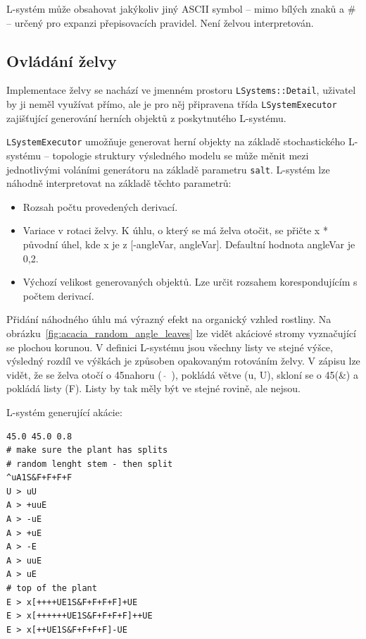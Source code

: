 \documentclass[thesis=M,czech]{FITthesis}[2019/12/23]
\begin{document}
L-systém může obsahovat jakýkoliv jiný ASCII symbol -- mimo bílých znaků a \# -- určený pro expanzi přepisovacích pravidel. Není želvou interpretován.

\subsection{Ovládání želvy}
Implementace želvy se nachází ve jmenném prostoru \texttt{LSystems::Detail}, uživatel by ji neměl využívat přímo, ale je pro něj připravena třída \texttt{LSystemExecutor} zajišťující generování herních objektů z poskytnutého L-systému.

\texttt{LSystemExecutor} umožňuje generovat herní objekty na základě stochastického L-systému -- topologie struktury výsledného modelu se může měnit mezi jednotlivými voláními generátoru na základě parametru \texttt{salt}. L-systém lze náhodně interpretovat na základě těchto parametrů:

\begin{itemize}
\item Rozsah počtu provedených derivací.
\item Variace v rotaci želvy. K úhlu, o který se má želva otočit, se přičte x * původní úhel, kde x je z [-angleVar, angleVar]. Defaultní hodnota angleVar je 0,2.
\item Výchozí velikost generovaných objektů. Lze určit rozsahem korespondujícím s počtem derivací.
\end{itemize}

Přidání náhodného úhlu má výrazný efekt na organický vzhled rostliny. Na obrázku~\ref{fig:acacia_random_angle_leaves} lze vidět akáciové stromy vyznačující se plochou korunou. V definici L-systému jsou všechny listy ve stejné výšce, výsledný rozdíl ve výškách je způsoben opakovaným rotováním želvy. V zápisu lze vidět, že se želva otočí o 45\degree nahoru (~$\hat{}$~), pokládá větve (u, U), skloní se o 45\degree (\&) a pokládá listy (F). Listy by tak měly být ve stejné rovině, ale nejsou.

L-systém generující akácie:

\begin{verbatim}
45.0 45.0 0.8
# make sure the plant has splits
# random lenght stem - then split
^uA1S&F+F+F+F
U > uU
A > +uuE
A > -uE
A > +uE
A > -E
A > uuE
A > uE
# top of the plant
E > x[++++UE1S&F+F+F+F]+UE
E > x[++++++UE1S&F+F+F+F]++UE
E > x[++UE1S&F+F+F+F]-UE
\end{verbatim}
\end{document}
